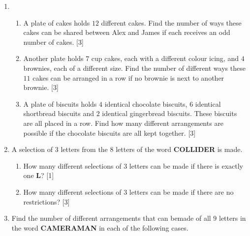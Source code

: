\newpage 


	
\mis   %

\begin{enumerate}
	\item \begin{enumerate}
		\item A plate of cakes holds $12$ different cakes. Find the number of ways these cakes can be shared between Alex and James if each receives an odd number of cakes. \hfill [3]
		\item Another plate holds $7$ cup cakes, each with a different colour icing, and $4$ brownies, each of a different size. Find the number of different ways these $11$ cakes can be arranged in a row if no	brownie is next to another brownie. \hfill [3]
		\item  A plate of biscuits holds $4$ identical chocolate biscuits, $6$ identical shortbread biscuits and $2$ identical gingerbread biscuits. These biscuits are all placed in a row. Find how many different	arrangements are possible if the chocolate biscuits are all kept together. \hfill [3]
		
			\end{enumerate}
		
	\item A selection of $3$ letters from the $8$ letters of the word \textbf{COLLIDER} is made.
	
	\begin{enumerate}
		\item How many different selections of $3$ letters can be made if there is exactly one \textbf{L}? \hfill[1]
		\item How many different selections of $3$ letters can be made if there are no restrictions? \hfill [3]
	\end{enumerate}
		
		
		
	\item Find the number of different arrangements that can bemade of all $9$ letters in the word \textbf{CAMERAMAN} in each of the following cases.	
	

\end{enumerate}
